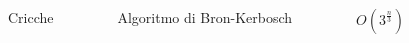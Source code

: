 \begin{minipage}[t]{\textwidth}
    \begin{columns}
        \begin{column}{0.25\textwidth}
        \centering
        Cricche
        \end{column}
    \hfill
        \begin{column}{0.25\textwidth}
        \centering
        Algoritmo di Bron-Kerbosch
        \end{column}
    \hfill
        \begin{column}{0.25\textwidth}
        \centering
        $O(3^{\frac{n}{3}})$
        \end{column}
    \hfill
        \begin{column}{0.25\textwidth}
        \centering
        \resizebox{0.65\textwidth}{!}{}
        \end{column}
    \end{columns}
\end{minipage}